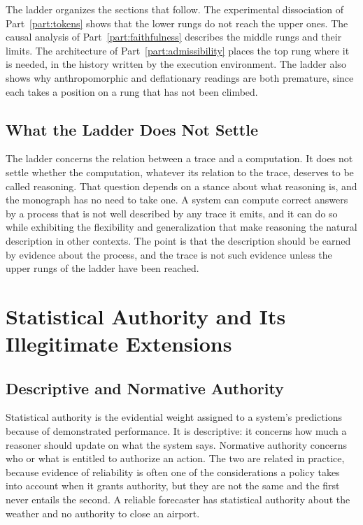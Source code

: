 The ladder organizes the sections that follow. The experimental dissociation of Part~\ref{part:tokens} shows that the lower rungs do not reach the upper ones. The causal analysis of Part~\ref{part:faithfulness} describes the middle rungs and their limits. The architecture of Part~\ref{part:admissibility} places the top rung where it is needed, in the history written by the execution environment. The ladder also shows why anthropomorphic and deflationary readings are both premature, since each takes a position on a rung that has not been climbed.

\section{What the Ladder Does Not Settle}

The ladder concerns the relation between a trace and a computation. It does not settle whether the computation, whatever its relation to the trace, deserves to be called reasoning. That question depends on a stance about what reasoning is, and the monograph has no need to take one. A system can compute correct answers by a process that is not well described by any trace it emits, and it can do so while exhibiting the flexibility and generalization that make reasoning the natural description in other contexts. The point is that the description should be earned by evidence about the process, and the trace is not such evidence unless the upper rungs of the ladder have been reached.

\chapter{Statistical Authority and Its Illegitimate Extensions}
\label{ch:authority}

\section{Descriptive and Normative Authority}

Statistical authority is the evidential weight assigned to a system's predictions because of demonstrated performance. It is descriptive: it concerns how much a reasoner should update on what the system says. Normative authority concerns who or what is entitled to authorize an action. The two are related in practice, because evidence of reliability is often one of the considerations a policy takes into account when it grants authority, but they are not the same and the first never entails the second. A reliable forecaster has statistical authority about the weather and no authority to close an airport.


